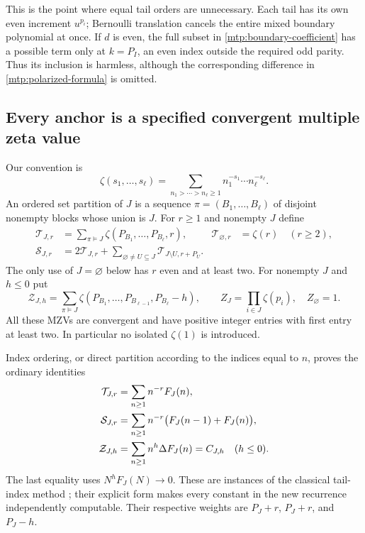 This is the point where equal tail orders are unnecessary. Each tail
has its own even increment $u^{p_i}$; Bernoulli translation cancels the
entire mixed boundary polynomial at once. If $d$ is even, the full
subset in \eqref{mtp:boundary-coefficient} has a possible term only at
$k=P_I$, an even index outside the required odd parity. Thus its
inclusion is harmless, although the corresponding difference in
\eqref{mtp:polarized-formula} is omitted.

\subsection{Every anchor is a specified convergent multiple zeta value}

Our convention is
\[
 \zeta(s_1,\ldots,s_\ell)
   =\sum_{n_1>\cdots>n_\ell\ge1}n_1^{-s_1}\cdots n_\ell^{-s_\ell}.
\]
An ordered set partition of $J$ is a sequence
$\pi=(B_1,\ldots,B_\ell)$ of disjoint nonempty blocks whose union is
$J$. For $r\ge1$ and nonempty $J$ define
\begin{align}
 \mathcal T_{J,r}
   &=\sum_{\pi\models J}\zeta(P_{B_1},\ldots,P_{B_\ell},r),
       &\mathcal T_{\varnothing,r}&=\zeta(r)\quad(r\ge2),
       \label{mtp:Tanchor}\\
 \mathcal S_{J,r}
   &=2\mathcal T_{J,r}
       +\sum_{\varnothing\ne U\subseteq J}\mathcal T_{J\setminus U,r+P_U}.
       \label{mtp:Sanchor}
\end{align}
The only use of $J=\varnothing$ below has $r$ even and at least two.
For nonempty $J$ and $h\le0$ put
\begin{equation}\label{mtp:Zanchor}
 \mathcal Z_{J,h}=\sum_{\pi\models J}
       \zeta(P_{B_1},\ldots,P_{B_{\ell-1}},P_{B_\ell}-h),
 \qquad Z_J=\prod_{i\in J}\zeta(p_i),\quad Z_\varnothing=1.
\end{equation}
All these MZVs are convergent and have positive integer entries with
first entry at least two. In particular no isolated $\zeta(1)$ is
introduced.

Index ordering, or direct partition according to the indices equal to
$n$, proves the ordinary identities
\begin{align}
 \mathcal T_{J,r}&=\sum_{n\ge1}n^{-r}F_J(n),\notag\\
 \mathcal S_{J,r}&=\sum_{n\ge1}n^{-r}\bigl(F_J(n-1)+F_J(n)\bigr),
       \label{mtp:anchor-series}\\
 \mathcal Z_{J,h}&=\sum_{n\ge1}n^h\Delta F_J(n)=C_{J,h}\quad(h\le0).
       \notag
\end{align}
The last equality uses $N^hF_J(N)\to0$. These are instances of the
classical tail-index method \cite{Hoffman}; their explicit form
makes every constant in the new recurrence independently computable.
Their respective weights are $P_J+r$, $P_J+r$, and $P_J-h$.

